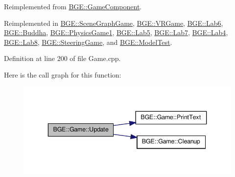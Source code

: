 Reimplemented from \hyperlink{class_b_g_e_1_1_game_component_ac8e444827ee0be9ad654cdff4d15f071}{B\-G\-E\-::\-Game\-Component}.



Reimplemented in \hyperlink{class_b_g_e_1_1_scene_graph_game_a0da77898a630ba53d2ca512f2992f7fb}{B\-G\-E\-::\-Scene\-Graph\-Game}, \hyperlink{class_b_g_e_1_1_v_r_game_a1883e546b4e2741354ba5abd9a14da08}{B\-G\-E\-::\-V\-R\-Game}, \hyperlink{class_b_g_e_1_1_lab6_ace5577edb1f9c38e007f20b843fe1030}{B\-G\-E\-::\-Lab6}, \hyperlink{class_b_g_e_1_1_buddha_a0723abeec23fa78f7d8c830e04c59746}{B\-G\-E\-::\-Buddha}, \hyperlink{class_b_g_e_1_1_physics_game1_ae67a81b2bd9fda6538266bb86b3e37f5}{B\-G\-E\-::\-Physics\-Game1}, \hyperlink{class_b_g_e_1_1_lab5_ae58b0a0640c84a48825a969f8e1396db}{B\-G\-E\-::\-Lab5}, \hyperlink{class_b_g_e_1_1_lab7_a0e9a409b00ca05c7eeff78cd5aef4f6e}{B\-G\-E\-::\-Lab7}, \hyperlink{class_b_g_e_1_1_lab4_a34fe4d66f91e194a4b129950b4966cfb}{B\-G\-E\-::\-Lab4}, \hyperlink{class_b_g_e_1_1_lab8_abc19add5c6e7fa56977f06c370393be1}{B\-G\-E\-::\-Lab8}, \hyperlink{class_b_g_e_1_1_steering_game_a09cc97712a026e87a229117021998153}{B\-G\-E\-::\-Steering\-Game}, and \hyperlink{class_b_g_e_1_1_model_test_a27dddd734ca2a9dfd49396707834571b}{B\-G\-E\-::\-Model\-Test}.



Definition at line 200 of file Game.\-cpp.



Here is the call graph for this function\-:
\nopagebreak
\begin{figure}[H]
\begin{center}
\leavevmode
\includegraphics[width=340pt]{class_b_g_e_1_1_game_a51ed573392d7bed791b67062e7c7a3d4_cgraph}
\end{center}
\end{figure}




